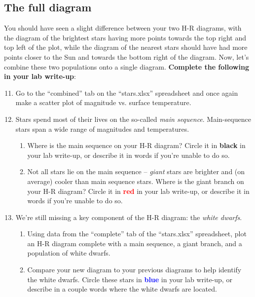 \documentclass[11pt]{article}
\begin{document}
\subsection{The full diagram}
You should have seen a slight difference between your two H-R diagrams, with the diagram of the brightest stars having more points towards the top right and top left of the plot, while the diagram of the nearest stars should have had more points closer to the Sun and towards the bottom right of the diagram. Now, let's combine these two populations onto a single diagram. \textbf{Complete the following in your lab write-up}:
\begin{enumerate}
\setcounter{enumi}{10}

    \item Go to the ``combined'' tab on the ``stars.xlsx'' spreadsheet and once again make a scatter plot of magnitude vs. surface temperature.
    
    \item Stars spend most of their lives on the so-called \emph{main sequence}. Main-sequence stars span a wide range of magnitudes and temperatures.
    \begin{enumerate}
        \item Where is the main sequence on your H-R diagram? Circle it in \textbf{black} in your lab write-up, or describe it in words if you're unable to do so. 
        
        \item Not all stars lie on the main sequence -- \emph{giant} stars are brighter and (on average) cooler than main sequence stars. Where is the giant branch on your H-R diagram? Circle it in \textbf{\textcolor{red}{red}} in your lab write-up, or describe it in words if you're unable to do so. 
    
    \end{enumerate}
    
    \item We're still missing a key component of the H-R diagram: the \emph{white dwarfs}.
    \begin{enumerate}
        \item Using data from the ``complete'' tab of the ``stars.xlsx'' spreadsheet, plot an H-R diagram complete with a main sequence, a giant branch, and a population of white dwarfs.
        
        \item Compare your new diagram to your previous diagrams to help identify the white dwarfs. Circle these stars in \textbf{\textcolor{blue}{blue}} in your lab write-up, or describe in a couple words where the white dwarfs are located. 

    \end{enumerate}
    
    
\end{enumerate} 
\end{document}
